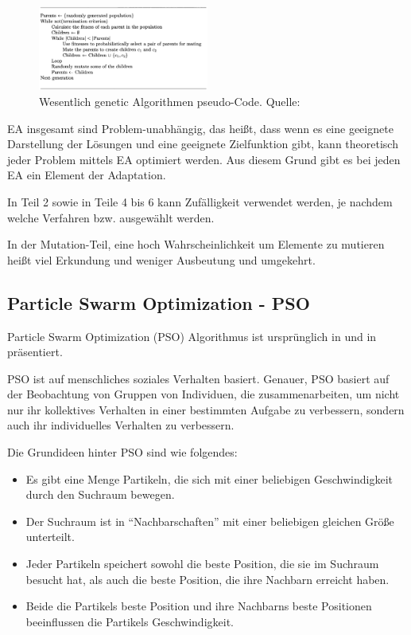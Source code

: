 \documentclass[twoside,twocolumn]{article}
\begin{document}
\begin{figure}[h]
\caption{ Wesentlich genetic Algorithmen pseudo-Code. Quelle: \cite{wiley_evolutionary}}
\label{fig:ga_pseudo}
\centering
\includegraphics[width=0.5\textwidth]{images/ga_pseudo.png}
\end{figure}

EA insgesamt sind Problem-unabhängig, das heißt, dass wenn es eine geeignete Darstellung der Lösungen und eine geeignete Zielfunktion gibt, kann theoretisch jeder Problem mittels EA optimiert werden. Aus diesem Grund gibt es bei jeden EA ein Element der Adaptation.\par
In Teil 2 sowie in Teile 4 bis 6 kann Zufälligkeit verwendet werden, je nachdem welche Verfahren bzw. ausgewählt werden.\par
In der Mutation-Teil, eine hoch Wahrscheinlichkeit um Elemente zu mutieren heißt viel Erkundung und weniger Ausbeutung und umgekehrt.

\subsection{Particle Swarm Optimization - PSO}
Particle Swarm Optimization (PSO) Algorithmus ist ursprünglich in \cite{kennedy_pso} und in \cite{shi_pso} präsentiert.\par
PSO ist auf menschliches soziales Verhalten basiert. \cite{eberhart_pso} Genauer,  PSO basiert auf der Beobachtung von Gruppen von Individuen, die zusammenarbeiten, um nicht nur ihr kollektives Verhalten in einer bestimmten Aufgabe zu verbessern, sondern auch ihr individuelles Verhalten zu verbessern.\par
Die Grundideen hinter PSO sind wie folgendes:

\begin{itemize}
\item Es gibt eine Menge Partikeln, die sich mit einer beliebigen Geschwindigkeit durch den Suchraum bewegen.
\item Der Suchraum ist in \enquote{Nachbarschaften} mit einer beliebigen gleichen Größe unterteilt.
\item Jeder Partikeln speichert sowohl die beste Position, die sie im Suchraum besucht hat, als auch die beste Position, die ihre Nachbarn erreicht haben.
\item Beide die Partikels beste Position und ihre Nachbarns beste Positionen beeinflussen die Partikels Geschwindigkeit.
\end{itemize}
\end{document}
